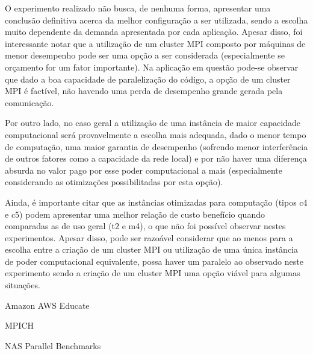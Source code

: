 \documentclass[a4paper,11pt]{article}
\begin{document}
O experimento realizado não busca, de nenhuma forma, apresentar uma conclusão definitiva acerca da melhor configuração a ser utilizada, sendo a escolha muito dependente da demanda apresentada por cada aplicação. Apesar disso, foi interessante notar que a utilização de um cluster MPI composto por máquinas de menor desempenho pode ser uma opção a ser considerada (especialmente se orçamento for um fator importante). 
Na aplicação em questão pode-se observar que dado a boa capacidade de paralelização do código, a opção de um cluster MPI é factível, não havendo uma perda de desempenho grande gerada pela comunicação.


Por outro lado, no caso geral a utilização de uma instância de  maior capacidade computacional será  provavelmente a escolha mais adequada, dado o menor tempo de computação, uma maior garantia de desempenho (sofrendo menor interferência  de outros fatores como a capacidade da rede local) e por não haver uma diferença absurda no valor pago por esse poder computacional a mais (especialmente considerando as otimizações possibilitadas por esta opção). 

Ainda, é importante citar que as instâncias otimizadas para computação (tipos c4 e c5) podem apresentar uma melhor relação de custo benefício quando comparadas as de uso geral (t2 e m4), o que não foi possível observar nestes experimentos. Apesar disso, pode ser razoável considerar que ao menos para a escolha entre a criação de um cluster MPI ou utilização de uma única instância de poder computacional equivalente, possa haver um paralelo ao observado neste experimento sendo a criação de um cluster MPI uma opção viável para algumas situações.



\vspace{0.5cm}

\begin{thebibliography}{99}

\vspace{0.5cm}




	Amazon AWS Educate

	MPICH 


	NAS Parallel Benchmarks








\end{thebibliography}
\end{document}
